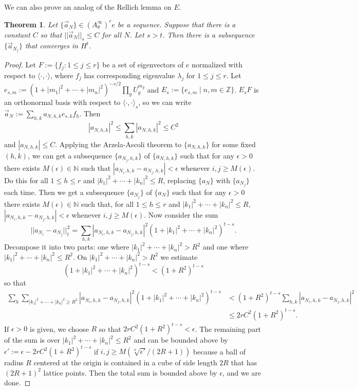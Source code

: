 \documentclass[10pt]{article}
\newtheorem{thm}{Theorem}[section]
\theoremstyle{remark}
\theoremstyle{definition}
\begin{document}
We can also prove an analog of the Rellich lemma on $E$.
\begin{thm}
Let $\{\vec{a}_N\}\in(A_{\theta}^{\infty})^re$ be a sequence. Suppose that there
is a constant $C$ so that $||\vec{a}_N||_s\le C$ for all $N$. Let $s>t$. Then
there is a subsequence $\{\vec{a}_{N_j}\}$ that converges in $H^t$.
\end{thm}
\begin{proof}
Let $F:=\{f_j:1\le j\le r\}$ be a set of eigenvectors of $e$ normalized
with respect to $\langle\cdot,\cdot\rangle$, where $f_j$ has corresponding
eigenvalue $\lambda_j$ for $1\le j\le r$.
Let $e_{s,m}:=(1+|m_1|^2+\cdots+|m_n|^2)^{-s/2}\prod_gU_g^{m_g}$ and
$E_s:=\{e_{s,m}\mid n,m\in\mathbb Z\}$.
$E_sF$ is an orthonormal basis
with respect to $\langle\cdot,\cdot\rangle_s$, so we can write
$\vec{a}_N:=\sum_{h,k}a_{N,h,k}e_{s,k}f_h$. Then
$$|a_{N,h,k}|^2\le\sum_{h,k}|a_{N,h,k}|^2\le C^2$$
and $|a_{N,h,k}|\le C$.
Applying the Arzela-Ascoli theorem to $\{a_{N,h,k}\}$ for some fixed
$(h,k)$, we can get a subsequence
$\{a_{N_j,h,k}\}$ of $\{a_{N,h,k}\}$
such that for any $\epsilon>0$ there exists $M(\epsilon)\in\mathbb N$
such that $|a_{N_i,h,k}-a_{N_j,h,k}|<\epsilon$ whenever
$i,j\ge M(\epsilon)$.
Do this for all $1\le h\le r$ and $|k_1|^2+\cdots+|k_n|^2\le R$,
replacing $\{a_N\}$ with $\{a_{N_j}\}$
each time. Then we get a subsequence $\{a_{N_j}\}$ of $\{a_N\}$
such that for any $\epsilon>0$ there exists $M(\epsilon)\in\mathbb N$
such that, for all $1\le h\le r$ and $|k_1|^2+\cdots+|k_n|^2\le R$,
$|a_{N_i,h,k}-a_{N_j,h,k}|<\epsilon$ whenever $i,j\ge M(\epsilon)$.
Now consider the sum $$||a_{N_i}-a_{N_j}||_t^2
=\sum_{h,k}|a_{N_i,h,k}-a_{N_j,h,k}|^2(1+|k_1|^2+\cdots+|k_n|^2)^{t-s}.$$
Decompose it into two parts: one where $|k_1|^2+\cdots+|k_n|^2>R^2$ and one
where $|k_1|^2+\cdots+|k_n|^2\le R^2$.
On $|k_1|^2+\cdots+|k_n|^2>R^2$ we estimate
$$(1+|k_1|^2+\cdots+|k_n|^2)^{t-s}<(1+R^2)^{t-s}$$ so that
\begin{align*}
\sum_h\sum_{|k_1|^2+\cdots+|k_n|^2\ge R^2}|a_{N_i,h,k}-a_{N_j,h,k}|^2
(1+|k_1|^2+\cdots+|k_n|^2)^{t-s}
&<(1+R^2)^{t-s}\sum_{h,k}|a_{N_i,h,k}-a_{N_j,h,k}|^2 \\
&\le2rC^2(1+R^2)^{t-s}.
\end{align*}
If $\epsilon>0$ is given, we choose $R$ so that $2rC^2(1+R^2)^{t-s}<\epsilon$.
The remaining part of the sum is over $|k_1|^2+\cdots+|k_n|^2\le R^2$ and
can be bounded above by
$\epsilon':=\epsilon-2rC^2(1+R^2)^{t-s}$ if
$i,j\ge M(\sqrt[n]{\epsilon'}/(2R+1))$
because a ball of radius $R$ centered at the origin is contained in a cube
of side length $2R$ that has $(2R+1)^2$ lattice points.
Then the total sum is bounded above by $\epsilon$, and we are done.
\end{proof}
\end{document}

